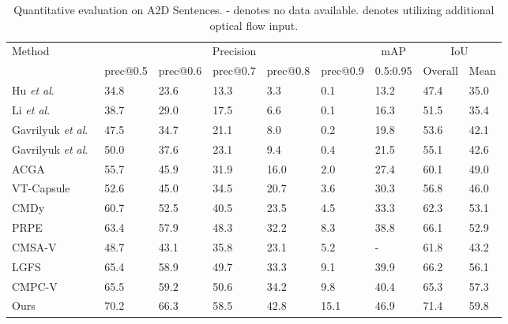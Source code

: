 \documentclass[10pt,twocolumn,letterpaper]{article}
\begin{document}
\begin{table*}[t]
\setlength{\tabcolsep}{4pt}
\small
\centering
\caption{\small{Quantitative evaluation on A2D Sentences. - denotes no data available.  denotes utilizing additional optical flow input.}} \renewcommand{\arraystretch}{1.0}
\begin{tabular}{p{3.0cm}<{\centering}||p{1.2cm}<{\centering}|p{1.2cm}<{\centering}|p{1.2cm}<{\centering}|p{1.2cm}<{\centering}
|p{1.2cm}<{\centering}|p{1.2cm}<{\centering}|p{1.2cm}<{\centering}|p{1.2cm}<{\centering}}\hline
\multirow{2}{*}{Method}
&\multicolumn{5}{c|}{Precision} & \multicolumn{1}{c|}{mAP} & \multicolumn{2}{c}{IoU}\\
\cline{2-9}
&prec@0.5 &prec@0.6 &prec@0.7 &prec@0.8 &prec@0.9   &0.5:0.95   &Overall &Mean  \\
\hline \hline
Hu \emph{et al}.~\cite{hu2016segmentation}               &34.8 &23.6 &13.3 &3.3  &0.1  &13.2 &47.4 &35.0\\
Li \emph{et al}.~\cite{li2017tracking}                   &38.7 &29.0 &17.5 &6.6  &0.1  &16.3 &51.5 &35.4\\
Gavrilyuk \emph{et al}.~\cite{gavrilyuk2018actor}        &47.5 &34.7 &21.1 &8.0  &0.2  &19.8 &53.6 &42.1\\
Gavrilyuk \emph{et al}.~\cite{gavrilyuk2018actor}    &50.0 &37.6 &23.1 &9.4  &0.4  &21.5 &55.1 &42.6\\
ACGA~\cite{wang2019asymmetric}                           &55.7 &45.9 &31.9 &16.0 &2.0  &27.4 &60.1 &49.0\\
VT-Capsule~\cite{mcintosh2020visual}                     &52.6 &45.0 &34.5 &20.7 &3.6  &30.3 &56.8 &46.0\\
CMDy~\cite{wang2020context}                              &60.7 &52.5 &40.5 &23.5 &4.5  &33.3 &62.3 &53.1\\
PRPE~\cite{ningpolar}                                    &63.4 &57.9 &48.3 &32.2 &8.3  &38.8 &66.1 &52.9\\
CMSA-V~\cite{ye2021referring}                            &48.7 &43.1 &35.8 &23.1 &5.2  &-    &61.8 &43.2\\
LGFS~\cite{hui2021collaborative}                         &65.4 &58.9 &49.7 &33.3 &9.1  &39.9 &66.2 &56.1\\
CMPC-V~\cite{liu2021cross}                               &65.5 &59.2 &50.6 &34.2 &9.8  &40.4 &65.3 &57.3\\
\hline \hline
Ours                                                            &70.2 &66.3 &58.5 &42.8 &15.1 &46.9 &71.4 &59.8\\ \hline
\end{tabular}
\label{tab:video_a2d}
\end{table*}
\end{document}
